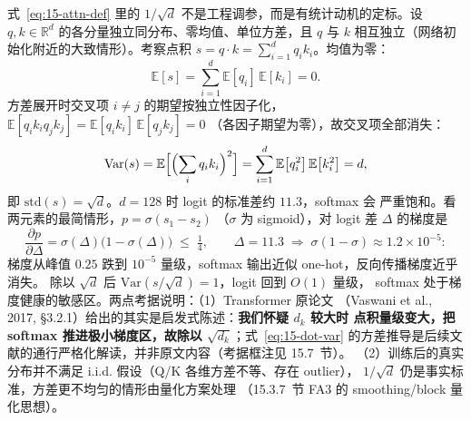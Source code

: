 式~\ref{eq:15-attn-def} 里的 $1/\sqrt{d}$ 不是工程调参，而是有统计动机的定标。设
$q, k \in \mathbb{R}^{d}$ 的各分量独立同分布、零均值、单位方差，且 $q$ 与 $k$
相互独立（网络初始化附近的大致情形）。考察点积
$s = q \cdot k = \sum_{i=1}^{d} q_i k_i$。均值为零：
\begin{equation}
  \mathbb{E}[s] = \sum_{i=1}^{d} \mathbb{E}[q_i]\,\mathbb{E}[k_i] = 0 .
\end{equation}
方差展开时交叉项 $i \ne j$ 的期望按独立性因子化，
$\mathbb{E}[q_i k_i q_j k_j] = \mathbb{E}[q_i k_i]\,\mathbb{E}[q_j k_j] = 0$
（各因子期望为零），故交叉项全部消失：
\begin{equation}
  \mathrm{Var}(s) = \mathbb{E}\Bigl[\Bigl(\sum_i q_i k_i\Bigr)^{2}\Bigr]
  = \sum_{i=1}^{d} \mathbb{E}\bigl[q_i^{2}\bigr]\,\mathbb{E}\bigl[k_i^{2}\bigr]
  = d ,
  \label{eq:15-dot-var}
\end{equation}
即 $\mathrm{std}(s) = \sqrt{d}$。$d = 128$ 时 logit 的标准差约 $11.3$，softmax 会
严重饱和。看两元素的最简情形，$p = \sigma(s_1 - s_2)$
（$\sigma$ 为 sigmoid），对 logit 差 $\Delta$ 的梯度是
\begin{equation}
  \frac{\partial p}{\partial \Delta} = \sigma(\Delta)\bigl(1 - \sigma(\Delta)\bigr)
  \;\le\; \tfrac{1}{4},
  \qquad
  \Delta = 11.3 \;\Rightarrow\; \sigma(1-\sigma) \approx 1.2 \times 10^{-5} :
  \label{eq:15-sat}
\end{equation}
梯度从峰值 $0.25$ 跌到 $10^{-5}$ 量级，softmax 输出近似 one-hot，反向传播梯度近乎消失。
除以 $\sqrt{d}$ 后 $\mathrm{Var}(s/\sqrt{d}) = 1$，logit 回到 $O(1)$ 量级，
softmax 处于梯度健康的敏感区。两点考据说明：（1）Transformer 原论文
（Vaswani et al., 2017, \S 3.2.1）给出的其实是启发式陈述：\textbf{我们怀疑 $d_k$ 较大时
点积量级变大，把 softmax 推进极小梯度区，故除以 $\sqrt{d_k}$}；式~\ref{eq:15-dot-var}
的方差推导是后续文献的通行严格化解读，并非原文内容（考据框注见 15.7~节）。
（2）训练后的真实分布并不满足 i.i.d. 假设（Q/K 各维方差不等、存在 outlier），
$1/\sqrt{d}$ 仍是事实标准，方差更不均匀的情形由量化方案处理
（15.3.7~节 FA3 的 smoothing/block 量化思想）。

